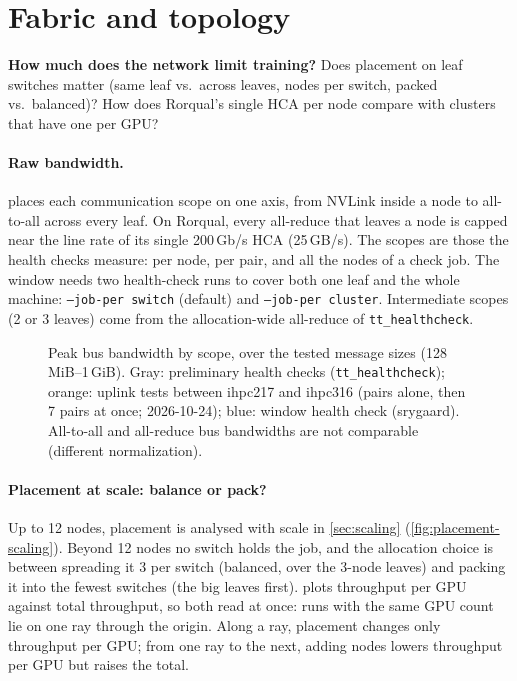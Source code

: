 \section{Fabric and topology}
\label{sec:fabric}

\begin{question}
  \textbf{How much does the network limit training?} Does placement on leaf switches matter (same leaf
  vs.\ across leaves, nodes per switch, packed vs.\ balanced)? How does Rorqual's single HCA per node
  compare with clusters that have one per GPU?
\end{question}

\paragraph{Raw bandwidth.}  places each communication scope on one axis, from NVLink inside a
node to all-to-all across every leaf. On Rorqual, every all-reduce that leaves a node is capped near the
line rate of its single 200\,Gb/s HCA (25\,GB/s). The scopes are those the health checks measure:
per node, per pair, and all the nodes of a check job. The window needs two health-check runs to cover
both one leaf and the whole machine: \texttt{--job-per switch} (default) and \texttt{--job-per cluster}.
Intermediate scopes (2 or 3 leaves) come from the allocation-wide all-reduce of \texttt{tt\_healthcheck}.

\begin{figure}[h]
  \centering{}
  \caption{Peak bus bandwidth by scope, over the tested message sizes (128\,MiB--1\,GiB). Gray:
    preliminary health checks (\texttt{tt\_healthcheck}); orange: uplink tests between ihpc217 and ihpc316
    (pairs alone, then 7 pairs at once; 2026-10-24); blue: window health check (srygaard). All-to-all
    and all-reduce bus bandwidths are not comparable (different normalization). }
  \label{fig:comm}
\end{figure}


\paragraph{Placement at scale: balance or pack?} Up to 12 nodes, placement is analysed with scale in
\cref{sec:scaling} (\cref{fig:placement-scaling}). Beyond 12 nodes no switch holds the job, and the
allocation choice is between spreading it 3 per switch (balanced, over the 3-node leaves) and packing it
into the fewest switches (the big leaves first).  plots throughput per GPU
against total throughput, so both read at once: runs with the same GPU count lie on one ray through the
origin. Along a ray, placement changes only throughput per GPU; from one ray to the next, adding nodes
lowers throughput per GPU but raises the total.

